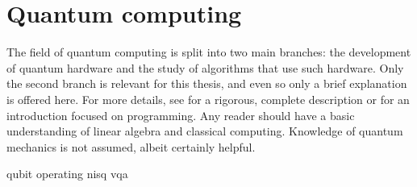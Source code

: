 \chapter{Quantum computing}
\label{chap:qc}
The field of quantum computing is split into two main branches: the development of quantum hardware and the study of algorithms that use such hardware.
Only the second branch is relevant for this thesis, and even so only a brief explanation is offered here.
For more details, see \cite{nielsen2010} for a rigorous, complete description or \cite{qiskit_textbook} for an introduction focused on programming.
Any reader should have a basic understanding of linear algebra and classical computing.
Knowledge of quantum mechanics is not assumed, albeit certainly helpful.

{qubit}
{operating}
{nisq}
{vqa}




